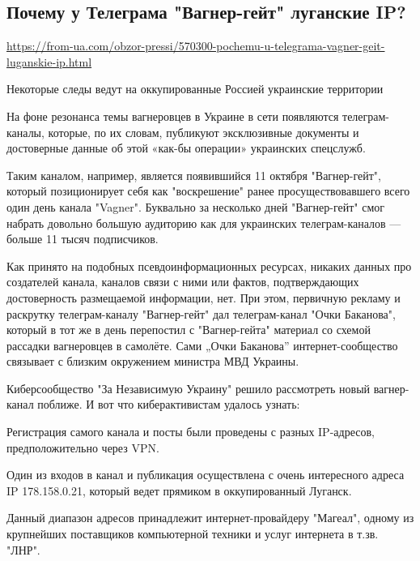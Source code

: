  
 

\subsection{Почему у Телеграма "Вагнер-гейт" луганские IP?}
\label{sec:15_10_2020.news.ua.from_ua.1_ips_wagner_gate}

\url{https://from-ua.com/obzor-pressi/570300-pochemu-u-telegrama-vagner-geit-luganskie-ip.html}

Некоторые следы ведут на оккупированные Россией украинские территории

На фоне резонанса темы вагнеровцев в Украине в сети появляются телеграм-каналы,
которые, по их словам, публикуют эксклюзивные документы и достоверные данные об
этой «как-бы операции» украинских спецслужб.

Таким каналом, например, является появившийся 11 октября "Вагнер-гейт", который
позиционирует себя как "воскрешение" ранее просуществовавшего всего один день
канала "Vagner". Буквально за несколько дней "Вагнер-гейт" смог набрать
довольно большую аудиторию как для украинских телеграм-каналов --- больше 11
тысяч подписчиков.

Как принято на подобных псевдоинформационных ресурсах, никаких данных про
создателей канала, каналов связи с ними или фактов, подтверждающих
достоверность размещаемой информации, нет. При этом, первичную рекламу и
раскрутку телеграм-каналу "Вагнер-гейт" дал телеграм-канал "Очки Баканова",
который в тот же в день перепостил с "Вагнер-гейта" материал со схемой рассадки
вагнеровцев в самолёте. Сами „Очки Баканова” интернет-сообщество связывает с
близким окружением министра МВД Украины.

Киберсообщество "За Независимую Украину" решило рассмотреть новый вагнер-канал
поближе. И вот что киберактивистам удалось узнать:

Регистрация самого канала и посты были проведены с разных IP-адресов,
предположительно через VPN.

Один из входов в канал и публикация осуществлена с очень интересного адреса IP
178.158.0.21, который ведет прямиком в оккупированный Луганск.

Данный диапазон адресов принадлежит интернет-провайдеру "Магеал", одному из
крупнейших поставщиков компьютерной техники и услуг интернета в т.зв. "ЛНР".

